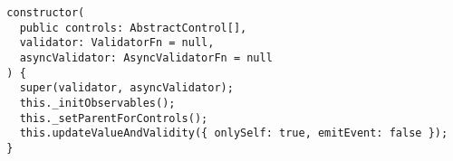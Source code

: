 \begin{verbatim}
  constructor(
    public controls: AbstractControl[],
    validator: ValidatorFn = null,
    asyncValidator: AsyncValidatorFn = null
  ) {
    super(validator, asyncValidator);
    this._initObservables();
    this._setParentForControls();
    this.updateValueAndValidity({ onlySelf: true, emitEvent: false });
  }
\end{verbatim}
